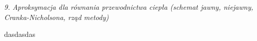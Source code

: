 \textit{9. Aproksymacja dla równania przewodnictwa ciepła (schemat jawny, niejawny, Cranka-Nicholsona, rząd metody)}

dasdasdas
